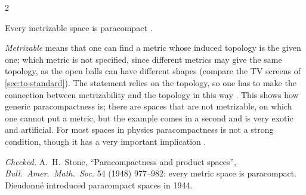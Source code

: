 \begin{paracol}{2}
\begin{theorem}[Stone]\label{thm:iv-stone}
Every metrizable space is paracompact .
\end{theorem}
\emph{Metrizable} means that one can find a metric whose induced topology is the given one; which metric is not specified, since different metrics may give the
same topology, as the open balls can have different shapes (compare the TV screens of \cref{sec:to-standard}). The statement relies on the topology, so one has to make
the connection between metrizability and the topology in this way . This shows how generic paracompactness is;
there are spaces that are not metrizable, on which one cannot put a metric, but the example comes in a second and is very exotic and artificial. For most spaces in physics
paracompactness is not a strong condition, though it has a very important implication .
\begin{history}[Stone]
\emph{Checked.} A.~H.~Stone, ``Paracompactness and product spaces'', \emph{Bull.\ Amer.\ Math.\ Soc.} 54 (1948) 977--982: every metric space is paracompact. Dieudonn\'e introduced
paracompact spaces in 1944.
\end{history}


\end{paracol}
